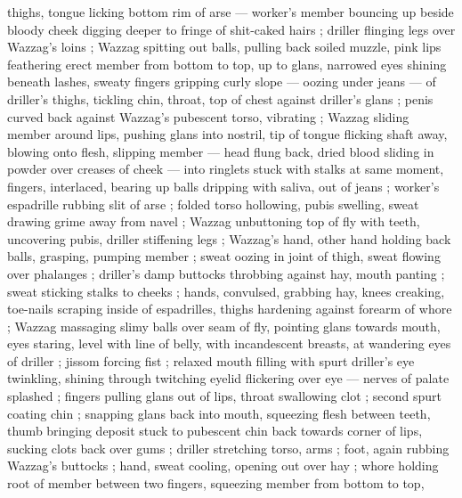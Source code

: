 thighs, tongue licking bottom rim of arse --- worker's member bouncing up beside bloody cheek {\dashcom} digging deeper to fringe of shit-caked hairs ; driller flinging legs over Wazzag's loins ; Wazzag spitting out balls, pulling back soiled muzzle, pink lips feathering erect member from bottom to top, up to glans, narrowed eyes shining beneath lashes, sweaty fingers gripping curly slope --- oozing under jeans --- of driller's thighs, tickling chin, throat, top of chest against driller's glans ; penis curved back against Wazzag's pubescent torso, vibrating ; Wazzag sliding member around lips, pushing glans into nostril, tip of tongue flicking shaft away, blowing onto flesh, slipping member --- head flung back, dried blood sliding in powder over creases of cheek --- into ringlets stuck with stalks {\col} at same moment, fingers, interlaced, bearing up balls dripping with saliva, out of jeans ; worker's espadrille rubbing slit of arse ; folded torso hollowing, pubis swelling, sweat drawing grime away from navel ; Wazzag unbuttoning top of fly with teeth, uncovering pubis, driller stiffening legs ; Wazzag's hand, other hand holding back balls, grasping, pumping member ; sweat oozing in joint of thigh, sweat flowing over phalanges ; driller's damp buttocks throbbing against hay, mouth panting ; sweat sticking stalks to cheeks ; hands, convulsed, grabbing hay, knees creaking, toe-nails scraping inside of espadrilles, thighs hardening against forearm of whore ; Wazzag massaging slimy balls over seam of fly, pointing glans towards mouth, eyes staring, level with line of belly, with incandescent breasts, at wandering eyes of driller ; jissom forcing fist ; relaxed mouth filling with spurt {\col} driller's eye twinkling, shining through twitching eyelid flickering over eye --- nerves of palate splashed ; fingers pulling glans out of lips, throat swallowing clot ; second spurt coating chin ; snapping glans back into mouth, squeezing flesh between teeth, thumb bringing deposit stuck to pubescent chin back towards corner of lips, sucking clots back over gums ; driller stretching torso, arms ; foot, again rubbing Wazzag's buttocks ; hand, sweat cooling, opening out over hay ; whore holding root of member between two fingers, squeezing member from bottom to top, 
